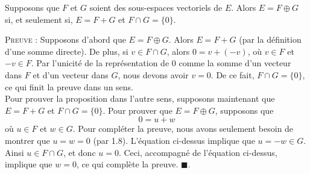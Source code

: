 \documentclass[12pt]{book}
\theoremstyle{plain}
\begin{document}
\begin{prop}
    Supposons que $F$ et $G$ soient des sous-espaces vectoriels de $E$. Alors $E=F\oplus G$ si, et seulement si, $E=F+G$ et $F \cap G=\{0\}$.
\end{prop}
\textsc{Preuve :} Supposons d'abord que $E=F\oplus G$. Alors $E=F+G$ (par la définition d'une somme directe). De plus, si $v\in F \cap G$, alors $0=v+(-v)$, où $v\in F$ et $-v\in F$. Par l'unicité de la représentation de 0 comme la somme d'un vecteur dans $F$ et d'un vecteur dans $G$, nous devons avoir $v=0$. De ce fait, $F\cap G=\{0\}$, ce qui finit la preuve dans un sens.\\
\indent
Pour prouver la proposition dans l'autre sens, supposons maintenant que $E=F+G$ et $F\cap G=\{0\}$. Pour prouver que $E=F\oplus G$, supposons que
\begin{equation*}
    0=u+w
\end{equation*}
où $u\in F$ et $w\in G$. Pour compléter la preuve, nous avons seulement besoin de montrer que $u=w=0$ (par 1.8). L'équation ci-dessus implique que $u=-w\in G$. Ainsi $u\in F\cap G$, et donc $u=0$. Ceci, accompagné de l'équation ci-dessus, implique que $w=0$, ce qui complète la preuve. \hfill$\blacksquare$.





\end{document}
